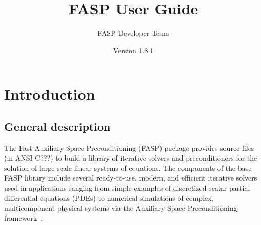 \documentclass[11pt]{memoir}
\title{\Huge FASP User Guide}
\author{FASP Developer Team}
\date{\vfill Version 1.8.1} %
\begin{document}
\clearpage\maketitle
\thispagestyle{empty}

\newpage
\setcounter{page}{1}
\tableofcontents

\chapter{Introduction}\label{ch:intro}




\section{General description}
The Fast Auxiliary Space Preconditioning (FASP) package provides
source files (in {\color{red}ANSI C???}) to build a library of
iterative solvers and preconditioners for the solution of large scale
linear systems of equations.  The components of the base FASP library
include several ready-to-use, modern, and efficient iterative solvers
used in applications ranging from simple examples of discretized
scalar partial differential equations (PDEs) to numerical simulations
of complex, multicomponent physical systems via the Auxiliary Space
Preconditioning framework~\cite{Xu.Xu.2010ff}.
\end{document}
